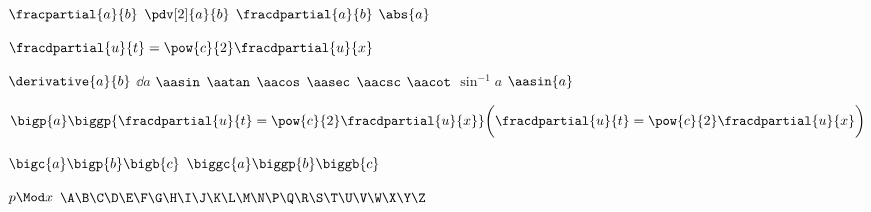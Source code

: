 $\fracpartial{a}{b}$
$\pdv[2]{a}{b}$
$\fracdpartial{a}{b}$
$\abs{a}$

$\fracdpartial{u}{t} = \pow{c}{2} \fracdpartial{u}{x}$

$\derivative{a}{b}$
$\dd{a}$ 
$\aasin$
$\aatan$
$\aacos$
$\aasec$
$\aacsc$
$\aacot$
$\sin^{-1}a$
$\aasin{a}$


$\bigp{a} \biggp{\fracdpartial{u}{t} = \pow{c}{2} \fracdpartial{u}{x}} \biggl(\fracdpartial{u}{t} = \pow{c}{2} \fracdpartial{u}{x}\biggr)$

$\bigc{a} \bigp{b} \bigb{c}$
$\biggc{a} \biggp{b} \biggb{c}$

\restartequation


$p\Mod x$
$\A \B \C \D \E \F \G \H \I \J \K \L \M \N \P \Q \R \S \T \U \V \W \X \Y \Z$